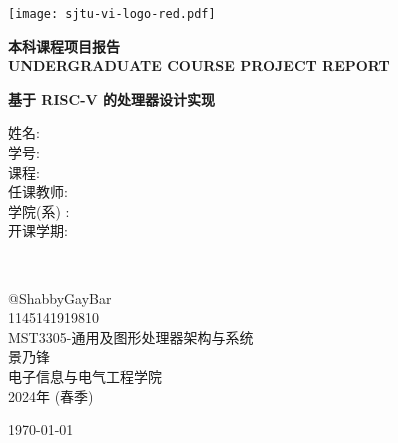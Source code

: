 
\begin{titlepage}
	\begin{center}
		\texttt{[image: sjtu-vi-logo-red.pdf]}
		\vspace*{1cm}

		\huge
		\textbf{本科课程项目报告} \\
		\Large
		\textbf{UNDERGRADUATE COURSE PROJECT REPORT}

		\vspace{2cm}
		\LARGE
		\textbf{基于 RISC-V 的处理器设计实现} \\

		\vfill

		\large
		\begin{minipage}{0.2\textwidth}
			\begin{flushleft}
				\Large
				姓\qquad 名: \\
				学\qquad 号: \\
				课\qquad 程: \\
				任课教师: \\
				学院(系) : \\
				开课学期: 
			\end{flushleft}
		\end{minipage}
		~
		\begin{minipage}{0.7\textwidth}
			\begin{center}
				\Large
				@ShabbyGayBar \\
				1145141919810 \\
				MST3305-通用及图形处理器架构与系统 \\
				景乃锋 \\
				电子信息与电气工程学院 \\
				2024年 (春季)
			\end{center}
		\end{minipage}
		
		\vspace{1cm}
		\Large
		\today
	\end{center}
\end{titlepage}
